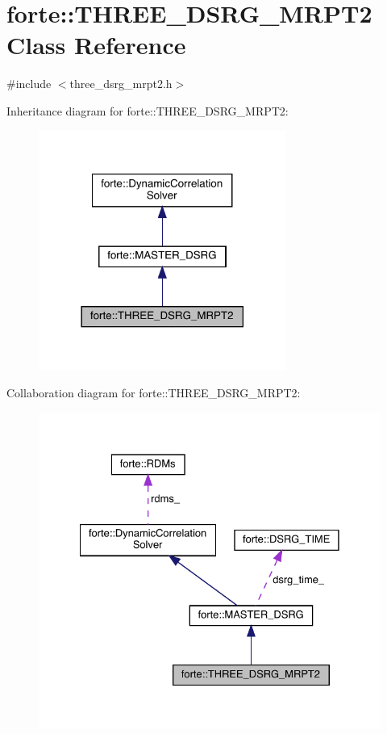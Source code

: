 \hypertarget{classforte_1_1_t_h_r_e_e___d_s_r_g___m_r_p_t2}{}\section{forte\+:\+:T\+H\+R\+E\+E\+\_\+\+D\+S\+R\+G\+\_\+\+M\+R\+P\+T2 Class Reference}
\label{classforte_1_1_t_h_r_e_e___d_s_r_g___m_r_p_t2}


{\ttfamily \#include $<$three\+\_\+dsrg\+\_\+mrpt2.\+h$>$}



Inheritance diagram for forte\+:\+:T\+H\+R\+E\+E\+\_\+\+D\+S\+R\+G\+\_\+\+M\+R\+P\+T2\+:
\nopagebreak
\begin{figure}[H]
\begin{center}
\leavevmode
\includegraphics[width=230pt]{classforte_1_1_t_h_r_e_e___d_s_r_g___m_r_p_t2__inherit__graph}
\end{center}
\end{figure}


Collaboration diagram for forte\+:\+:T\+H\+R\+E\+E\+\_\+\+D\+S\+R\+G\+\_\+\+M\+R\+P\+T2\+:
\nopagebreak
\begin{figure}[H]
\begin{center}
\leavevmode
\includegraphics[width=328pt]{classforte_1_1_t_h_r_e_e___d_s_r_g___m_r_p_t2__coll__graph}
\end{center}
\end{figure}
